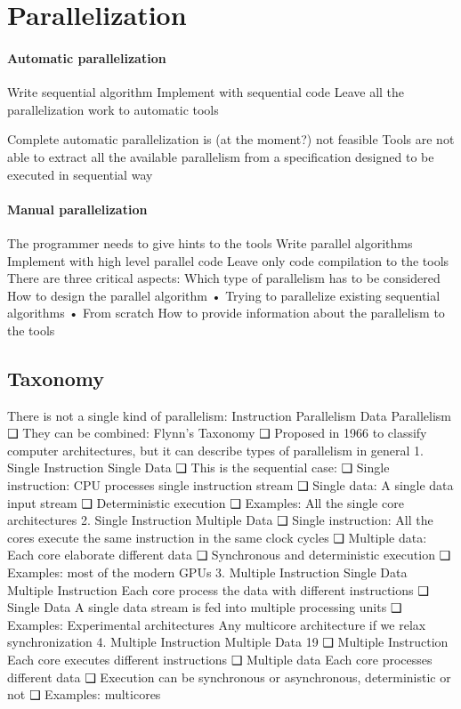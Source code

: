\section{Parallelization}

\paragraph*{Automatic parallelization}
Write sequential
algorithm
Implement with
sequential code
Leave all the
parallelization work to
automatic tools

Complete automatic
parallelization is (at the
moment?) not feasible
Tools are not able to
extract all the available
parallelism from a
specification designed
to be executed in
sequential way


\paragraph*{Manual parallelization}
The programmer needs
to give hints to the
tools
Write parallel
algorithms
Implement with high
level parallel code
Leave only code
compilation to the tools
There are three critical aspects:
Which type of parallelism has to be considered
How to design the parallel algorithm
• Trying to parallelize existing sequential
algorithms
• From scratch
How to provide information about the
parallelism to the tools


\subsection{Taxonomy}
There is not a single kind of parallelism:
Instruction Parallelism
Data Parallelism
❑ They can be combined: Flynn’s Taxonomy
❑ Proposed in 1966 to classify computer
architectures, but it can describe types of
parallelism in general
1. Single Instruction Single Data
❑ This is the sequential case:
❑ Single instruction:
CPU processes single instruction stream
❑ Single data:
A single data input stream
❑ Deterministic execution
❑ Examples:
All the single core architectures
2. Single Instruction Multiple Data
❑ Single instruction:
All the cores execute the same instruction in the
same clock cycles
❑ Multiple data:
Each core elaborate different data
❑ Synchronous and deterministic execution
❑ Examples:
most of the
modern GPUs
3. Multiple Instruction Single Data 
Multiple Instruction
Each core process the data with different
instructions
❑ Single Data
A single data stream is fed into multiple
processing units
❑ Examples:
Experimental
architectures
Any multicore
architecture if
we relax
synchronization
4. Multiple Instruction Multiple Data 19
❑ Multiple Instruction
Each core executes different instructions
❑ Multiple data
Each core processes different data
❑ Execution can be synchronous or asynchronous,
deterministic or not
❑ Examples:
multicores

